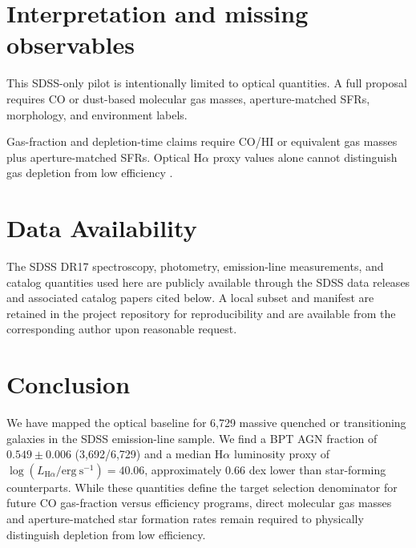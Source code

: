 \documentclass[twocolumn]{aastex702}
\begin{document}
\section{Interpretation and missing observables}\label{sec:missing}
This SDSS-only pilot is intentionally limited to optical quantities. A full proposal requires CO or dust-based molecular gas masses, aperture-matched SFRs, morphology, and environment labels.

Gas-fraction and depletion-time claims require CO/HI or equivalent gas masses plus aperture-matched SFRs. Optical H$\alpha$ proxy values alone cannot distinguish gas depletion from low efficiency \citep{coldgass1, coldgass2, xcoldgass2017, xgass2018}.


\section{Data Availability}\label{sec:data-avail}
The SDSS DR17 spectroscopy, photometry, emission-line measurements, and catalog quantities used here are publicly available through the SDSS data releases and associated catalog papers cited below. A local subset and manifest are retained in the project repository for reproducibility and are available from the corresponding author upon reasonable request.

\section{Conclusion}\label{sec:conclusion}
We have mapped the optical baseline for 6,729 massive quenched or transitioning galaxies in the SDSS emission-line sample. We find a BPT AGN fraction of $0.549 \pm 0.006$ (3,692/6,729) and a median H$\alpha$ luminosity proxy of $\log(L_{\mathrm{H}\alpha} / \mathrm{erg~s}^{-1}) = 40.06$, approximately 0.66 dex lower than star-forming counterparts. While these quantities define the target selection denominator for future CO gas-fraction versus efficiency programs, direct molecular gas masses and aperture-matched star formation rates remain required to physically distinguish depletion from low efficiency.
\end{document}
